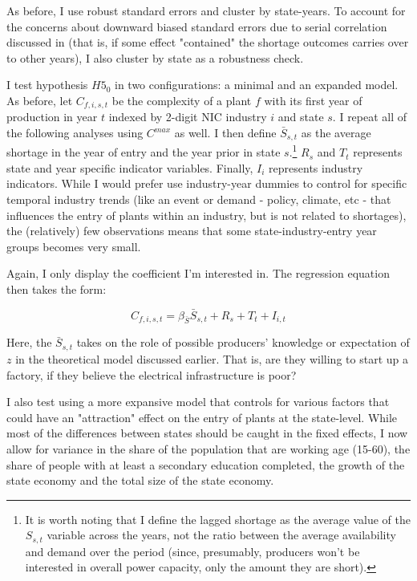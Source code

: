 \documentclass[11pt]{article}
\begin{document}
As before, I use robust standard errors and cluster by state-years. To account for the concerns about downward biased standard errors due to serial correlation discussed in \cite{bertrand_how_2004} (that is, if some effect "contained" the shortage outcomes carries over to other years), I also cluster by state as a robustness check.

I test hypothesis $H5_0$ in two configurations: a minimal and an expanded model. As before, let $C_{f,i,s,t}$ be the complexity of a plant $f$ with its first year of production in year $t$ indexed by 2-digit NIC industry $i$ and state $s$. I repeat all of the following analyses using $C^{max}$ as well. I then define $\bar{S}_{s,t}$ as the average shortage in the year of entry and the year prior in state $s$.\footnote{It is worth noting that I define the lagged shortage as the average value of the $S_{s,t}$ variable across the years, not the ratio between the average availability and demand over the period (since, presumably, producers won't be interested in overall power capacity, only the amount they are short).} $R_{s}$ and $T_{t}$ represents state and year specific indicator variables. Finally, $I_{i}$ represents industry indicators. While I would prefer use industry-year dummies to control for specific temporal industry trends (like an event or demand - policy, climate, etc - that influences the entry of plants within an industry, but is not related to shortages), the (relatively) few observations means that some state-industry-entry year groups becomes very small. 

Again, I only display the coefficient I'm interested in. The regression equation then takes the form:

\begin{equation}
\label{eqn:entry}
C_{f,i,s,t} = \beta_{\bar{S}} \bar{S}_{s,t} + R_{s} + T_{t} + I_{i,t} 
\end{equation}

Here, the $\bar{S}_{s,t}$ takes on the role of possible producers' knowledge or expectation of $z$ in the theoretical model discussed earlier. That is, are they willing to start up a factory, if they believe the electrical infrastructure is poor?

I also test using a more expansive model that controls for various factors that could have an "attraction" effect on the entry of plants at the state-level. While most of the differences between states should be caught in the fixed effects, I now allow for variance in the share of the population that are working age (15-60), the share of people with at least a secondary education completed, the growth of the state economy and the total size of the state economy. 
\end{document}
